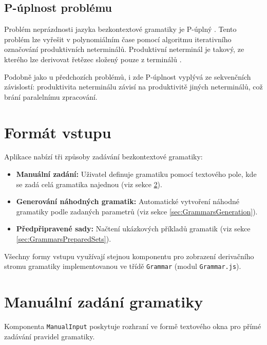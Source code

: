 \subsection{P-úplnost problému}
\label{sec:GrammarsCompleteness}

Problém neprázdnosti jazyka bezkontextové gramatiky je P-úplný \cite{sawa, miyano}. Tento problém lze vyřešit v polynomiálním čase pomocí algoritmu iterativního označování produktivních neterminálů. Produktivní neterminál je takový, ze kterého lze derivovat řetězec složený pouze z terminálů \cite{sawa}.

Podobně jako u předchozích problémů, i zde P-úplnost vyplývá ze sekvenčních závislostí: produktivita neterminálu závisí na produktivitě jiných neterminálů, což brání paralelnímu zpracování.

\section{Formát vstupu}
\label{sec:GrammarsInput}

Aplikace nabízí tři způsoby zadávání bezkontextové gramatiky:

\begin{itemize}
    \item \textbf{Manuální zadání:} Uživatel definuje gramatiku pomocí textového pole, kde se zadá celá gramatika najednou (viz sekce \ref{sec:GrammarsManual}).
    \item \textbf{Generování náhodných gramatik:} Automatické vytvoření náhodné gramatiky podle zadaných parametrů (viz sekce \ref{sec:GrammarsGeneration}).
    \item \textbf{Předpřipravené sady:} Načtení ukázkových příkladů gramatik (viz sekce \ref{sec:GrammarsPreparedSets}).
\end{itemize}

Všechny formy vstupu využívají stejnou komponentu pro zobrazení derivačního stromu gramatiky implementovanou ve třídě \texttt{Grammar} (modul \texttt{Grammar.js}).

\section{Manuální zadání gramatiky}
\label{sec:GrammarsManual}

Komponenta \texttt{ManualInput} poskytuje rozhraní ve formě textového okna pro přímé zadávání pravidel gramatiky.

